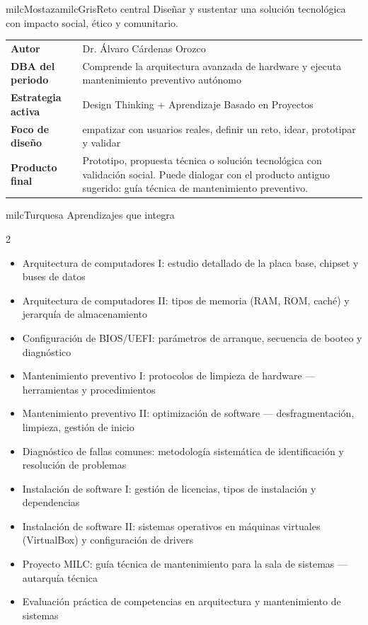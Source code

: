 \documentclass[11pt,letterpaper]{article}
\begin{document}
\begin{softbox}{milcMostaza}{milcGris}{Reto central}
Diseñar y sustentar una solución tecnológica con impacto social, ético y comunitario.
\end{softbox}

\begin{tabularx}{\textwidth}{>{\bfseries}p{3.4cm}X}
\rowcolor{milcMagenta!12}Autor & Dr. Álvaro Cárdenas Orozco\\
DBA del periodo & Comprende la arquitectura avanzada de hardware y ejecuta mantenimiento preventivo autónomo\\
Estrategia activa & Design Thinking + Aprendizaje Basado en Proyectos\\
Foco de diseño & empatizar con usuarios reales, definir un reto, idear, prototipar y validar\\
Producto final & Prototipo, propuesta técnica o solución tecnológica con validación social. Puede dialogar con el producto antiguo sugerido: guía técnica de mantenimiento preventivo.\\
\end{tabularx}

\begin{titlebox}{milcTurquesa}
Aprendizajes que integra
\end{titlebox}
\begin{multicols}{2}
\begin{itemize}[leftmargin=*]
\item Arquitectura de computadores I: estudio detallado de la placa base, chipset y buses de datos
\item Arquitectura de computadores II: tipos de memoria (RAM, ROM, caché) y jerarquía de almacenamiento
\item Configuración de BIOS/UEFI: parámetros de arranque, secuencia de booteo y diagnóstico
\item Mantenimiento preventivo I: protocolos de limpieza de hardware — herramientas y procedimientos
\item Mantenimiento preventivo II: optimización de software — desfragmentación, limpieza, gestión de inicio
\item Diagnóstico de fallas comunes: metodología sistemática de identificación y resolución de problemas
\item Instalación de software I: gestión de licencias, tipos de instalación y dependencias
\item Instalación de software II: sistemas operativos en máquinas virtuales (VirtualBox) y configuración de drivers
\item Proyecto MILC: guía técnica de mantenimiento para la sala de sistemas — autarquía técnica
\item Evaluación práctica de competencias en arquitectura y mantenimiento de sistemas
\end{itemize}
\end{multicols}
\end{document}
